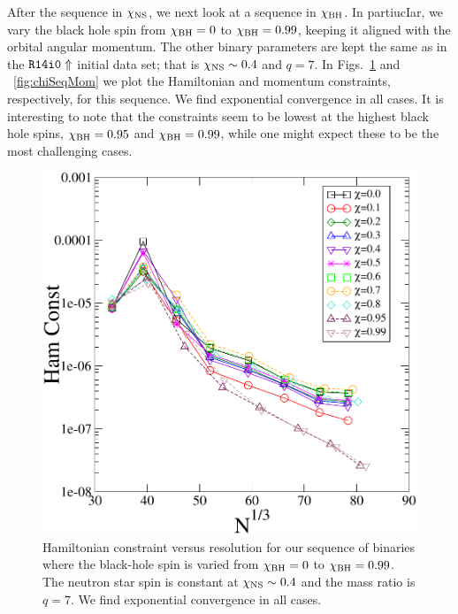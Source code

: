 After the sequence in $\chi_{\rm NS}$, we next look at a sequence in
$\chi_{\rm BH}$. In partiucIar, we vary the black hole spin from
$\chi_{\rm BH}=0$ to $\chi_{\rm BH}=0.99$, keeping it aligned with the orbital angular
momentum.
 The other binary parameters are kept the same
as in the ${\tt R14i0\Uparrow}$ initial data set; that is $\chi_{\rm
  NS}\sim0.4$ and $q=7$. In Figs.~\ref{fig:chiSeqHam} and
~\ref{fig:chiSeqMom} we plot the Hamiltonian and momentum constraints,
respectively, for this sequence. We find exponential convergence in
all cases. It is interesting to note that the constraints seem to be
lowest at the highest black hole spins, $\chi_{\rm BH}=0.95$ and
$\chi_{\rm BH}=0.99$, while one might expect these to be the most
challenging cases.

\begin{figure}
\includegraphics[width=0.95\columnwidth]{chap4/chiSeqHam}
\caption[Hamiltonian constraint for the sequence in $\chi_{\rm BH}$.]{\label{fig:chiSeqHam}Hamiltonian constraint versus
  resolution for our sequence of binaries where the black-hole spin is
  varied from $\chi_{\rm BH}=0$ to $\chi_{\rm BH}=0.99$. The neutron star spin is constant at $\chi_{\rm NS}\sim 0.4$ and the mass ratio is $q=7$. We find exponential convergence in all cases.}
\end{figure}

